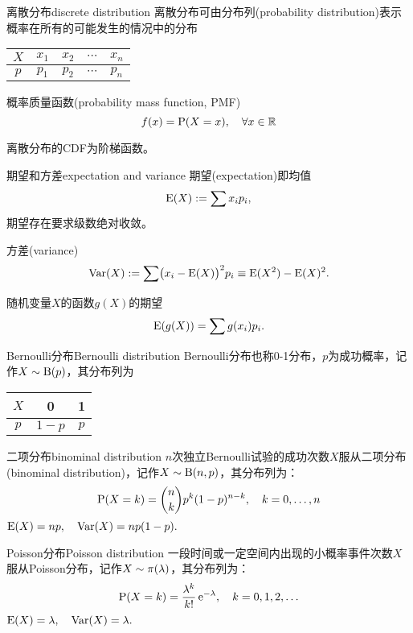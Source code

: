 \begin{definition}{离散分布}{discrete distribution}
	离散分布可由分布列(probability distribution)表示概率在所有的可能发生的情况中的分布
	\begin{center}
		\begin{tabular}{ccccc}
			\toprule
			$X$&$x_1$&$x_2$&$\cdots$&$x_n$\\
			\midrule
			$p$&$p_1$&$p_2$&$\cdots$&$p_n$\\
			\bottomrule
		\end{tabular}
	\end{center}
	概率质量函数(probability mass function, PMF)
	\[
		f(x)=\P(X=x),\quad\forall x\in\RR
	\]
\end{definition}
离散分布的CDF为阶梯函数。

\begin{definition}{期望和方差}{expectation and variance}
	期望(expectation)即均值
	\begin{align}
		\E(X):=\sum x_ip_i,
	\end{align}
	期望存在要求级数绝对收敛。

	方差(variance)
	\begin{align}
		\Var(X):=\sum\bigkh{x_i-\E(X)}^2p_i\equiv\E(X^2)-\E(X)^2.
	\end{align}
\end{definition}
\begin{example}{}{}
	随机变量$X$的函数$g(X)$的期望
	\[
		\E(g(X))=\sum g(x_i)p_i.
	\]
\end{example}
\begin{definition}{Bernoulli分布}{Bernoulli distribution}
	Bernoulli分布也称0-1分布，$p$为成功概率，记作$X\sim\Bern(p)$，其分布列为
	\begin{center}
		\begin{tabular}{ccc}
			\toprule
			$X$&0&1\\
			\midrule
			$p$&$1-p$&$p$\\
			\bottomrule
		\end{tabular}
	\end{center}
\end{definition}
\begin{definition}{二项分布}{binominal distribution}
	$n$次独立Bernoulli试验的成功次数$X$服从二项分布(binominal distribution)，记作$X\sim\Bern(n,p)$，其分布列为：
	\[
		\P(X=k)=\binom nk p^k(1-p)^{n-k},\quad k=0,\ldots,n
	\]
	$\E(X)=np,\quad\Var(X)=np(1-p).$
\end{definition}
\begin{definition}{Poisson分布}{Poisson distribution}
	一段时间或一定空间内出现的小概率事件次数$X$服从Poisson分布，记作$X\sim\Pois(\lambda)$，其分布列为：
	\[
		\P(X=k)=\frac{\lambda^k}{k!}\e{-\lambda},\quad k=0,1,2,\ldots
	\]
	$\E(X)=\lambda,\quad\Var(X)=\lambda.$
\end{definition}
